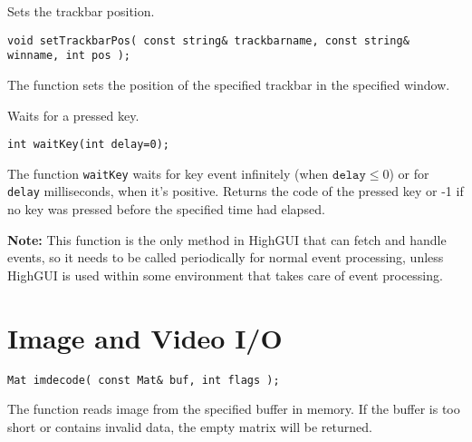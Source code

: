 Sets the trackbar position.

\begin{lstlisting}
void setTrackbarPos( const string& trackbarname, const string& winname, int pos );
\end{lstlisting}
\begin{description}
\end{description}

The function sets the position of the specified trackbar in the specified window.


Waits for a pressed key.

\begin{lstlisting}
int waitKey(int delay=0);
\end{lstlisting}
\begin{description}
\end{description}

The function \texttt{waitKey} waits for key event infinitely (when $\texttt{delay}\leq 0$) or for \texttt{delay} milliseconds, when it's positive. Returns the code of the pressed key or -1 if no key was pressed before the specified time had elapsed.

\textbf{Note:} This function is the only method in HighGUI that can fetch and handle events, so it needs to be called periodically for normal event processing, unless HighGUI is used within some environment that takes care of event processing.

\section{Image and Video I/O}


\begin{lstlisting}
Mat imdecode( const Mat& buf, int flags );
\end{lstlisting}
\begin{description}
\end{description}

The function reads image from the specified buffer in memory.
If the buffer is too short or contains invalid data, the empty matrix will be returned.

